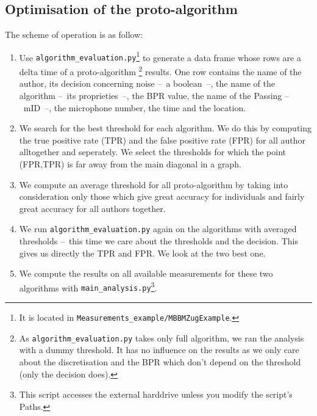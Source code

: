 \documentclass{article}\usepackage[]{graphicx}\usepackage[]{color}
\begin{document}
\subsection{Optimisation of the proto-algorithm} 
The scheme of operation is as follow:
\begin{enumerate}
\item Use {\tt algorithm{\_}evaluation.py}\footnote{It is located in {\tt Measurements{\_}example/MBBMZugExample}.} to generate a data frame whose rows are a delta time of a proto-algorithm \footnote{As {\tt algorithm{\_}evaluation.py} takes only full algorithm, we ran the analysis with a dummy threshold. It has no influence on the results as we only care about the discretisation and the BPR which don't depend on the threshold (only the decision does).} results. One row contains the name of the author, its decision concerning noise --~a boolean~--, the name of the algorithm --~its proprieties~--, the BPR value, the name of the Passing --~mID~--, the microphone number, the time and the location.

\item We search for the best threshold for each algorithm. We do this by computing the true positive rate (TPR) and the false positive rate (FPR) for all author alltogether and seperately. We select the thresholds for which the point (FPR,TPR) is far away from the main diagonal in a graph.

\item We compute an average threshold for all proto-algorithm by taking into consideration only those which give great accuracy for individuals and fairly great accuracy for all authors together.

\item We run {\tt algorithm{\_}evaluation.py} again on the algorithms with averaged thresholds --~this time we care about the thresholds and the decision. This gives us directly the TPR and FPR. We look at the two best one.

\item We compute the results on all available measurements for these two algorithms with {\tt main{\_}analysis.py}\footnote{This script accesses the external harddrive unless you modify the script's Paths.}.
\end{enumerate}
\end{document}
